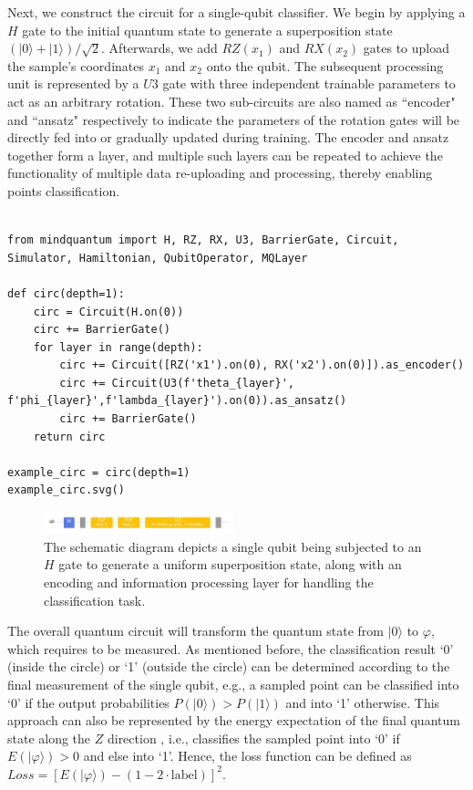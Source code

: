Next, we construct the circuit for a single-qubit classifier. We begin by applying a $H$ gate to the initial quantum state to generate a superposition state $(|0\rangle+|1\rangle)/\sqrt{2}$.
Afterwards, we add $RZ(x_1)$ and $RX(x_2)$ gates to upload the sample's  coordinates $x_1$ and $x_2$ onto the qubit. 
The subsequent processing unit is represented by a $U3$ gate with three independent trainable parameters to act as an arbitrary rotation.
These two sub-circuits are also named as ``encoder" and ``ansatz" respectively to indicate the parameters of the rotation gates will be directly fed into or gradually updated during training.
The encoder and ansatz together form a layer, and multiple such layers can be repeated to achieve the functionality of multiple data re-uploading and processing, thereby enabling points classification.

\begin{lstlisting} 

from mindquantum import H, RZ, RX, U3, BarrierGate, Circuit, Simulator, Hamiltonian, QubitOperator, MQLayer

def circ(depth=1):
    circ = Circuit(H.on(0))
    circ += BarrierGate()
    for layer in range(depth):
        circ += Circuit([RZ('x1').on(0), RX('x2').on(0)]).as_encoder()
        circ += Circuit(U3(f'theta_{layer}', f'phi_{layer}',f'lambda_{layer}').on(0)).as_ansatz()
        circ += BarrierGate()
    return circ

example_circ = circ(depth=1)
example_circ.svg()
\end{lstlisting}

\begin{figure}[H]
\centering
\includegraphics[width=0.49\textwidth]
{5.4.3_figures/data_reuploading_circ0.pdf}
\caption{The schematic diagram depicts a single qubit being subjected to an 
$H$ gate to generate a uniform superposition state, along with an encoding and information processing layer for handling the classification task.}
\label{data_reuploading_circ0}
\end{figure}

The overall quantum circuit will transform the quantum state from $|0\rangle$ to $\varphi$, which requires to be measured. 
As mentioned before, the classification result `0' (inside the circle) or `1' (outside the circle) can be determined according to the final measurement of the single qubit, e.g., a sampled point can be classified into `0' if the output probabilities $P(|0\rangle)>P(|1\rangle)$ and into  `1' otherwise.  
This approach can also be represented by the energy expectation of the final quantum state along the $Z$ direction , i.e., classifies the sampled point into `0’ if $E(|\varphi\rangle)>0$ and else into `1'. Hence, the loss function can be defined as $Loss=[E(|\varphi\rangle)-(1-2\cdot\mathrm{label})]^2$.

